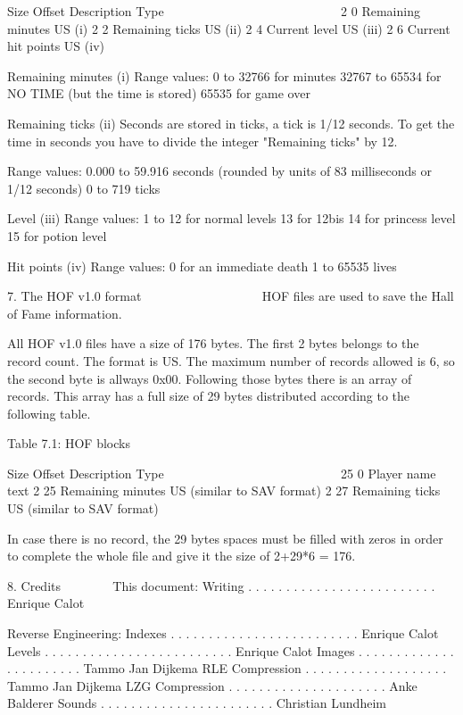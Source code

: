    Size Offset Description                  Type
   ~~~~ ~~~~~~ ~~~~~~~~~~~                  ~~~~
      2      0 Remaining minutes            US   (i)
      2      2 Remaining ticks              US   (ii)
      2      4 Current level                US   (iii)
      2      6 Current hit points           US   (iv)

 Remaining minutes (i)
  Range values:
   0     to 32766 for minutes
   32767 to 65534 for NO TIME (but the time is stored)
   65535 for game over

 Remaining ticks (ii)
  Seconds are stored in ticks, a tick is 1/12 seconds. To get the time in
  seconds you have to divide the integer "Remaining ticks" by 12.

  Range values:
   0.000 to 59.916 seconds
	                 (rounded by units of 83 milliseconds or 1/12 seconds)
   0     to 719    ticks

 Level (iii)
  Range values:
   1  to 12 for normal levels
   13 for 12bis
   14 for princess level
   15 for potion level

 Hit points (iv)
  Range values:
   0 for an immediate death
   1 to 65535 lives


7. The HOF v1.0 format
   ~~~ ~~~ ~~~~ ~~~~~~
 HOF files are used to save the Hall of Fame information.

 All HOF v1.0 files have a size of 176 bytes. The first 2 bytes belongs to
 the record count. The format is US. The maximum number of records allowed
 is 6, so the second byte is allways 0x00.
 Following those bytes there is an array of records. This array has a full
 size of 29 bytes distributed according to the following table.
 
                   Table 7.1: HOF blocks
                   ~~~~~~~~~~~~~~~~~~~~~

   Size Offset Description                  Type
   ~~~~ ~~~~~~ ~~~~~~~~~~~                  ~~~~
     25      0 Player name                  text
      2     25 Remaining minutes            US (similar to SAV format)
      2     27 Remaining ticks              US (similar to SAV format)

 In case there is no record, the 29 bytes spaces must be filled with zeros
 in order to complete the whole file and give it the size of 2+29*6 = 176.


8. Credits
   ~~~~~~~
 This document:
  Writing . . . . . . . . . . . . . . . . . . . . . . . . . Enrique Calot

 Reverse Engineering:
  Indexes . . . . . . . . . . . . . . . . . . . . . . . . . Enrique Calot
  Levels . . . . . . . . . . . . . . . . . . . . . . . . .  Enrique Calot
  Images . . . . . . . . . . . . . . . . . . . . . . .  Tammo Jan Dijkema
  RLE Compression . . . . . . . . . . . . . . . . . . . Tammo Jan Dijkema
  LZG Compression . . . . . . . . . . . . . . . . . . . . . Anke Balderer
  Sounds . . . . . . . . . . . . . . . . . . . . . . . Christian Lundheim
 
